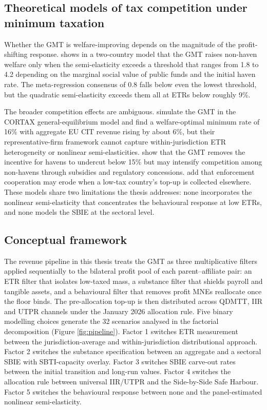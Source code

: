 \documentclass[11pt,a4paper]{article}
\begin{document}
\subsection{Theoretical models of tax competition under minimum taxation}

Whether the GMT is welfare-improving depends on the magnitude of the profit-shifting response. \citet{johannesen2022} shows in a two-country model that the GMT raises non-haven welfare only when the semi-elasticity exceeds a threshold that ranges from 1.8 to 4.2 depending on the marginal social value of public funds and the initial haven rate. The meta-regression consensus of 0.8 \citep{heckemeyer2017} falls below even the lowest threshold, but the \citet{dowd2017} quadratic semi-elasticity exceeds them all at ETRs below roughly 9\%. 

The broader competition effects are ambiguous. \citet{vantriet2025} simulate the GMT in the CORTAX general-equilibrium model and find a welfare-optimal minimum rate of 16\% with aggregate EU CIT revenue rising by about 6\%, but their representative-firm framework cannot capture within-jurisdiction ETR heterogeneity or nonlinear semi-elasticities. \citet{janeba2023} show that the GMT removes the incentive for havens to undercut below 15\% but may intensify competition among non-havens through subsidies and regulatory concessions. \citet{jean2026} add that enforcement cooperation may erode when a low-tax country's top-up is collected elsewhere. These models share two limitations the thesis addresses: none incorporates the nonlinear semi-elasticity that concentrates the behavioural response at low ETRs, and none models the SBIE at the sectoral level.

\subsection{Conceptual framework}

The revenue pipeline in this thesis treats the GMT as three multiplicative filters applied sequentially to the bilateral profit pool of each parent--affiliate pair: an ETR filter that isolates low-taxed mass, a substance filter that shields payroll and tangible assets, and a behavioural filter that removes profit MNEs reallocate once the floor binds. The pre-allocation top-up is then distributed across QDMTT, IIR and UTPR channels under the January 2026 allocation rule. Five binary modelling choices generate the 32 scenarios analysed in the factorial decomposition (Figure \ref{fig:pipeline}). Factor 1 switches ETR measurement between the jurisdiction-average and within-jurisdiction distributional approach. Factor 2 switches the substance specification between an aggregate and a sectoral SBIE with SBTI-capacity overlay. Factor 3 switches SBIE carve-out rates between the initial transition and long-run values. Factor 4 switches the allocation rule between universal IIR/UTPR and the Side-by-Side Safe Harbour. Factor 5 switches the behavioural response between none and the panel-estimated nonlinear semi-elasticity.
\end{document}
